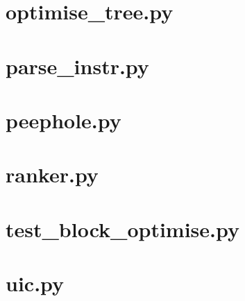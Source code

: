 \section{optimise\_tree.py}


\section{parse\_instr.py}


\section{peephole.py}


\section{ranker.py}


\section{test\_block\_optimise.py}


\section{uic.py}


